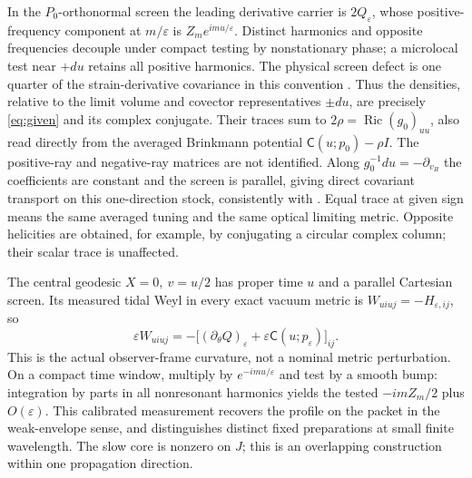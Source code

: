 \documentclass[11pt]{article}
\newcommand{\Ric}{\operatorname{Ric}}
\begin{document}
In the \(P_0\)-orthonormal screen the leading derivative carrier is \(2Q_\varepsilon\), whose positive-frequency component at \(m/\varepsilon\) is \(Z_m e^{imu/\varepsilon}\). Distinct harmonics and opposite frequencies decouple under compact testing by nonstationary phase; a microlocal test near \(+du\) retains all positive harmonics. The physical screen defect is one quarter of the strain-derivative covariance in this convention \cite{p29b}. Thus the densities, relative to the limit volume and covector representatives \(\pm du\), are precisely \eqref{eq:given} and its complex conjugate. Their traces sum to \(2\rho=\Ric(g_0)_{uu}\), also read directly from the averaged Brinkmann potential \(\mathsf C(u;p_0)-\rho I\). The positive-ray and negative-ray matrices are not identified. Along \(g_0^{-1}du=-\partial_{v_R}\) the coefficients are constant and the screen is parallel, giving direct covariant transport on this one-direction stock, consistently with \cite{hl,p29b}. Equal trace at given sign means the same averaged tuning and the same optical limiting metric. Opposite helicities are obtained, for example, by conjugating a circular complex column; their scalar trace is unaffected.

The central geodesic \(X=0,\ v=u/2\) has proper time \(u\) and a parallel Cartesian screen. Its measured tidal Weyl in every exact vacuum metric is \(W_{uiuj}=-H_{\varepsilon,ij}\), so
\[
 \varepsilon W_{uiuj}=-\bigl[(\partial_\theta Q)_\varepsilon+\varepsilon\mathsf C(u;p_\varepsilon)\bigr]_{ij}.
\]
This is the actual observer-frame curvature, not a nominal metric perturbation. On a compact time window, multiply by \(e^{-imu/\varepsilon}\) and test by a smooth bump: integration by parts in all nonresonant harmonics yields the tested \(-imZ_m/2\) plus \(O(\varepsilon)\). This calibrated measurement recovers the profile on the packet in the weak-envelope sense, and distinguishes distinct fixed preparations at small finite wavelength. The slow core is nonzero on \(J\); this is an overlapping construction within one propagation direction.
\end{document}
